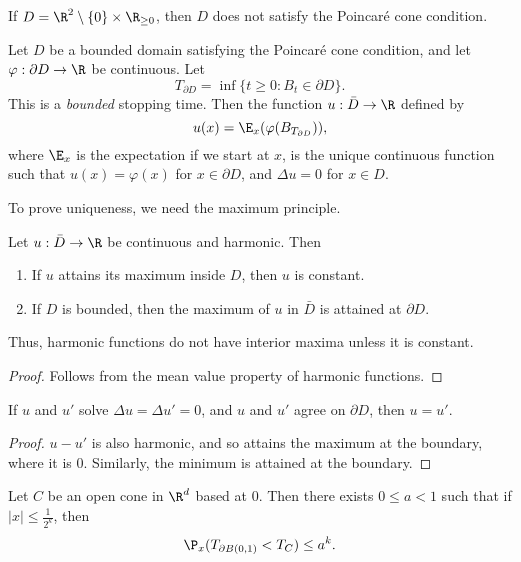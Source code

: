 \documentclass[a4paper]{article}
\begin{document}
\begin{eg}
  If $D = \R^2 \setminus \{0\} \times \R_{\geq 0}$, then $D$ does not satisfy the Poincar\'e cone condition.
\end{eg}

\begin{thm}
  Let $D$ be a bounded domain satisfying the Poincar\'e cone condition, and let $\varphi: \partial D \to \R$ be continuous. Let
  \[
    T_{\partial D} = \inf\{ t \geq 0 : B_t \in \partial D \}.
  \]
  This is a \emph{bounded} stopping time. Then the function $u: \bar{D} \to \R$ defined by
  \[
    u(x) = \E_x (\varphi(B_{T_{\partial D}})),
  \]
  where $\E_x$ is the expectation if we start at $x$, is the unique continuous function such that $u(x) = \varphi(x)$ for $x \in \partial D$, and $\Delta u = 0$ for $x \in D$.
\end{thm}

To prove uniqueness, we need the maximum principle.
\begin{defi}
  Let $u: \bar{D} \to \R$ be continuous and harmonic. Then
  \begin{enumerate}
    \item If $u$ attains its maximum inside $D$, then $u$ is constant.
    \item If $D$ is bounded, then the maximum of $u$ in $\bar{D}$ is attained at $\partial D$.
  \end{enumerate}
\end{defi}
Thus, harmonic functions do not have interior maxima unless it is constant.

\begin{proof}
  Follows from the mean value property of harmonic functions.
\end{proof}

\begin{cor}
  If $u$ and $u'$ solve $\Delta u = \Delta u' = 0$, and $u$ and $u'$ agree on $\partial D$, then $u = u'$.
\end{cor}

\begin{proof}
  $u - u'$ is also harmonic, and so attains the maximum at the boundary, where it is $0$. Similarly, the minimum is attained at the boundary.
\end{proof}

\begin{lemma}
  Let $C$ be an open cone in $\R^d$ based at $0$. Then there exists $0 \leq a < 1$ such that if $|x| \leq \frac{1}{2^k}$, then
  \[
    \P_x(T_{\partial B(0, 1)} < T_C) \leq a^k.
  \]
\end{lemma}
\end{document}
